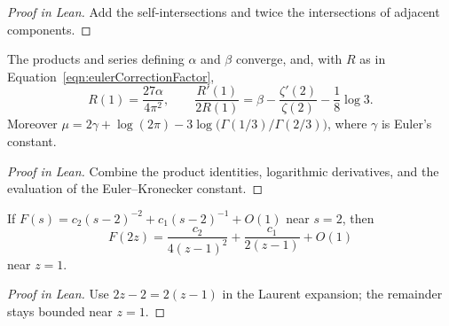 \begin{proof}[Proof in Lean]

\leanok

Add the self-intersections and twice the intersections of adjacent components.

\end{proof}

\begin{supportinglemma}

\label{helper:leadingConstants}


\leanok

The products and series defining $\alpha$ and $\beta$ converge, and, with $R$ as in Equation~\ref{eqn:eulerCorrectionFactor}, \[R(1)=\frac{27\alpha}{4\pi^2},\qquad \frac{R'(1)}{2R(1)}=\beta-\frac{\zeta'(2)}{\zeta(2)}-\frac18\log3.\] Moreover $\mu=2\gamma+\log(2\pi)-3\log\bigl(\Gamma(1/3)/\Gamma(2/3)\bigr)$, where $\gamma$ is Euler's constant.

\end{supportinglemma}

\begin{proof}[Proof in Lean]

\leanok


Combine the product identities, logarithmic derivatives, and the evaluation of the Euler--Kronecker constant.

\end{proof}

\begin{supportinglemma}

\label{helper:laurentRescaling}


\leanok

If $F(s)=c_2(s-2)^{-2}+c_1(s-2)^{-1}+O(1)$ near $s=2$, then \[F(2z)=\frac{c_2}{4(z-1)^2}+\frac{c_1}{2(z-1)}+O(1)\] near $z=1$.

\end{supportinglemma}

\begin{proof}[Proof in Lean]

\leanok

Use $2z-2=2(z-1)$ in the Laurent expansion; the remainder stays bounded near $z=1$.

\end{proof}

